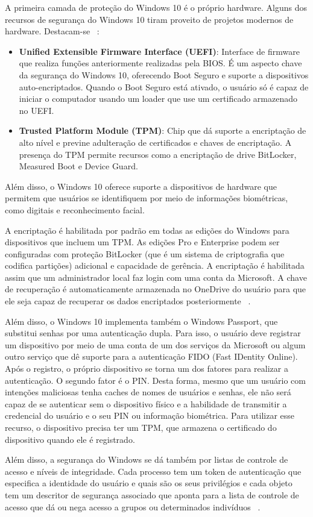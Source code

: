 A primeira camada de proteção do Windows 10 é o próprio hardware. Alguns dos recursos de segurança do Windows 10 tiram proveito de projetos modernos de hardware. Destacam-se ~\cite{introducing_windows}:

\begin{itemize}
\item \textbf{Unified Extensible Firmware Interface (UEFI)}: Interface de firmware que realiza funções anteriormente realizadas pela BIOS. É um aspecto chave da segurança do Windows 10, oferecendo Boot Seguro e suporte a dispositivos auto-encriptados. Quando o Boot Seguro está ativado, o usuário só é capaz de iniciar o computador usando um loader que use um certificado armazenado no UEFI.   
\item \textbf{Trusted Platform Module (TPM)}: Chip que dá suporte a encriptação de alto nível e previne adulteração de certificados e chaves de encriptação. A presença do TPM permite recursos como a encriptação de drive BitLocker, Measured Boot e Device Guard.
\end{itemize}

Além disso, o Windows 10 oferece suporte a dispositivos de hardware que permitem que usuários se identifiquem por meio de informações biométricas, como digitais e reconhecimento facial.

A encriptação é habilitada por padrão em todas as edições do Windows para dispositivos que incluem um TPM. As edições Pro e Enterprise podem ser configuradas com proteção BitLocker (que é um sistema de criptografia que codifica partições) adicional e capacidade de gerência. A encriptação é habilitada assim que um administrador local faz login com uma conta da Microsoft. A chave de recuperação é automaticamente armazenada no OneDrive do usuário para que ele seja capaz de recuperar os dados encriptados posteriormente ~\cite{introducing_windows}.

Além disso, o Windows 10 implementa também o Windows Passport, que substitui senhas por uma autenticação dupla. Para isso, o usuário deve registrar um dispositivo por meio de uma conta de um dos serviços da Microsoft ou algum outro serviço que dê suporte para a autenticação FIDO (Fast IDentity Online). Após o registro, o próprio dispositivo se torna um dos fatores para realizar a autenticação. O segundo fator é o PIN. Desta forma, mesmo que um usuário com intenções maliciosas tenha caches de nomes de usuários e senhas, ele não será capaz de se autenticar sem o dispositivo físico e a habilidade de transmitir a credencial do usuário e o seu PIN ou informação biométrica. Para utilizar esse recurso, o dispositivo precisa ter um TPM, que armazena o certificado do dispositivo quando ele é registrado.

Além disso, a segurança do Windows se dá também por listas de controle de acesso e níveis de integridade. Cada processo tem um token de autenticação que especifica a identidade do usuário e quais são os seus privilégios e cada objeto tem um descritor de segurança associado que aponta para a lista de controle de acesso que dá ou nega acesso a grupos ou determinados indivíduos ~\cite{tanenbaum}. 